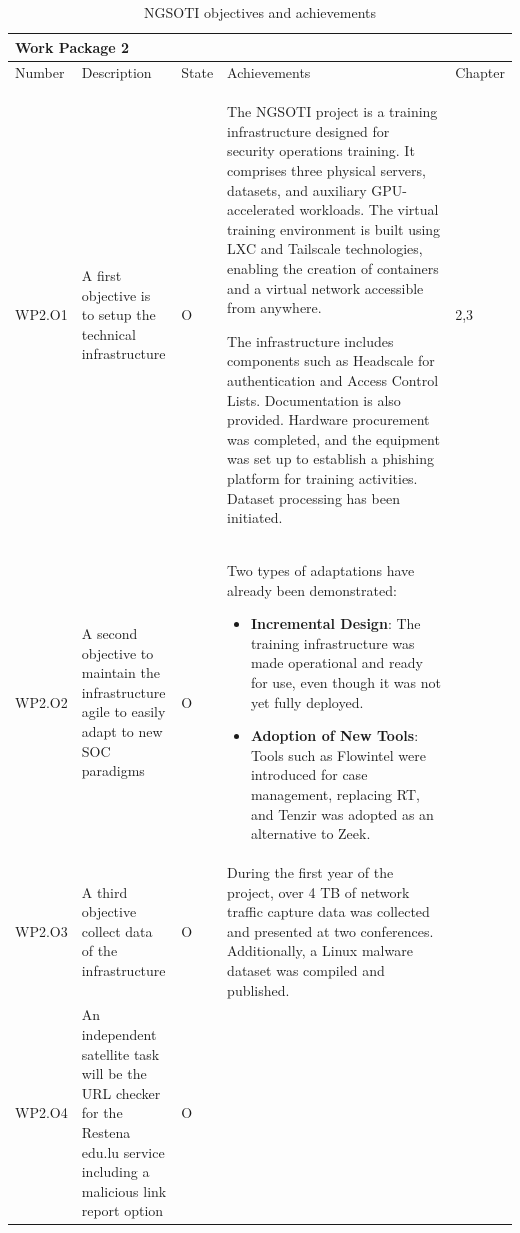 \begin{table}[h]
\centering

\begin{tabular}{ |p{0.07\linewidth}  |p{0.2\linewidth}|        p{0.04\linewidth}|    p{0.62\linewidth}|  p{0.07\linewidth}|}\hline
\multicolumn{5}{|p{0.97\linewidth}|}{Work Package 2} \\
\hline
                  Number             & Description & State & Achievements & Chapter \\
\hline
WP2.O1 &
A first objective is to setup the technical infrastructure & O &

The NGSOTI project is a training infrastructure designed for security
operations training. It comprises three physical servers, datasets, and
auxiliary GPU-accelerated workloads. The virtual training environment is
built using LXC and Tailscale technologies, enabling the creation of
containers and a virtual network accessible from anywhere.

The infrastructure includes components such as Headscale for authentication
and Access Control Lists. Documentation is also provided. Hardware
procurement was completed, and the equipment was set up to establish a
phishing platform for training activities. Dataset processing has been
initiated.

&
2,3 \\
\hline
WP2.O2 &
A second objective to maintain the infrastructure agile to easily adapt to new
SOC paradigms
&O &
Two types of adaptations have already been demonstrated:
\begin{itemize}
    \item \textbf{Incremental Design}: The training infrastructure was made
    operational and ready for use, even though it was not yet fully deployed.
    \item \textbf{Adoption of New Tools}: Tools such as Flowintel were introduced
    for case management, replacing RT, and Tenzir was adopted as an alternative
    to Zeek.
\end{itemize}

&
\\

\hline

WP2.O3 &
A third objective collect data of the infrastructure
& O &
During the first year of the project, over 4 TB of network traffic capture data was collected and presented at two conferences. Additionally, a Linux malware dataset was compiled and published.
&
\\

\hline

WP2.O4 &
An independent satellite task will be the URL checker for the Restena edu.lu
service including a malicious link report
option
& O &
&
\\
\hline
\end{tabular}
\caption{NGSOTI objectives and achievements}
\label{wp2obj}
\end{table}


